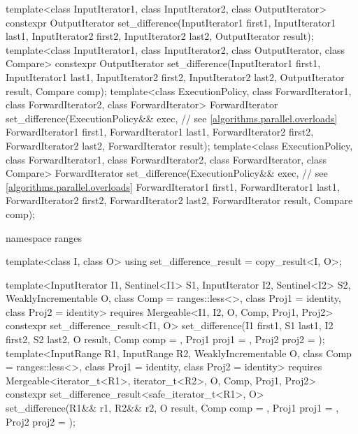 \begin{codeblock}
{  template<class InputIterator1, class InputIterator2, class OutputIterator>
    constexpr OutputIterator
      set_difference(InputIterator1 first1, InputIterator1 last1,
                     InputIterator2 first2, InputIterator2 last2,
                     OutputIterator result);
  template<class InputIterator1, class InputIterator2, class OutputIterator, class Compare>
    constexpr OutputIterator
      set_difference(InputIterator1 first1, InputIterator1 last1,
                     InputIterator2 first2, InputIterator2 last2,
                     OutputIterator result, Compare comp);
  template<class ExecutionPolicy, class ForwardIterator1, class ForwardIterator2,
           class ForwardIterator>
    ForwardIterator
      set_difference(ExecutionPolicy&& exec, // see \ref{algorithms.parallel.overloads}
                     ForwardIterator1 first1, ForwardIterator1 last1,
                     ForwardIterator2 first2, ForwardIterator2 last2,
                     ForwardIterator result);
  template<class ExecutionPolicy, class ForwardIterator1, class ForwardIterator2,
           class ForwardIterator, class Compare>
    ForwardIterator
      set_difference(ExecutionPolicy&& exec, // see \ref{algorithms.parallel.overloads}
                     ForwardIterator1 first1, ForwardIterator1 last1,
                     ForwardIterator2 first2, ForwardIterator2 last2,
                     ForwardIterator result, Compare comp);

  namespace ranges {
    template<class I, class O>
    using set_difference_result = copy_result<I, O>;

    template<InputIterator I1, Sentinel<I1> S1, InputIterator I2, Sentinel<I2> S2,
        WeaklyIncrementable O, class Comp = ranges::less<>, class Proj1 = identity, class Proj2 = identity>
      requires Mergeable<I1, I2, O, Comp, Proj1, Proj2>
      constexpr set_difference_result<I1, O>
        set_difference(I1 first1, S1 last1, I2 first2, S2 last2, O result,
                       Comp comp = {}, Proj1 proj1 = {}, Proj2 proj2 = {});
    template<InputRange R1, InputRange R2, WeaklyIncrementable O,
        class Comp = ranges::less<>, class Proj1 = identity, class Proj2 = identity>
      requires Mergeable<iterator_t<R1>, iterator_t<R2>, O, Comp, Proj1, Proj2>
      constexpr set_difference_result<safe_iterator_t<R1>, O>
        set_difference(R1&& r1, R2&& r2, O result,
                       Comp comp = {}, Proj1 proj1 = {}, Proj2 proj2 = {});
  }

}
\end{codeblock}
